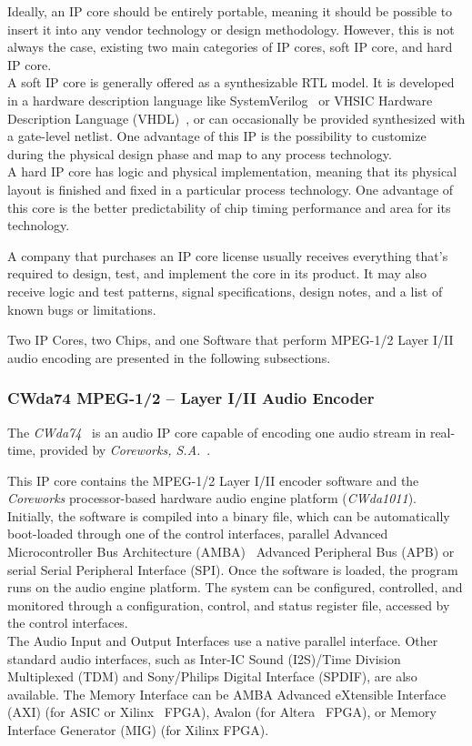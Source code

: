 Ideally, an IP core should be entirely portable, meaning it should be possible to insert it into any vendor technology or design methodology. However, this is not always the case, existing two main categories of IP cores, soft IP core, and hard IP core.\\
A soft IP core is generally offered as a synthesizable RTL model. It is developed in a hardware description language like SystemVerilog~\cite{ieee:systemVerilog} or VHSIC Hardware Description Language (VHDL)~\cite{ieee:vhdl}, or can occasionally be provided synthesized with a gate-level netlist. One advantage of this IP is the possibility to customize during the physical design phase and map to any process technology.\\
A hard IP core has logic and physical implementation, meaning that its physical layout is finished and fixed in a particular process technology.
One advantage of this core is the better predictability of chip timing performance and area for its technology. 

A company that purchases an IP core license usually receives everything that's required to design, test, and implement the core in its product. It may also receive logic and test patterns, signal specifications, design notes, and a list of known bugs or limitations.

Two IP Cores, two Chips, and one Software that perform MPEG-1/2 Layer I/II audio encoding are presented in the following subsections.

\subsubsection{CWda74 MPEG-1/2 – Layer I/II Audio Encoder}
 
The \textit{CWda74}~\cite{CWda74} is an audio IP core capable of encoding one audio stream in real-time, provided by \textit{Coreworks, S.A.}~\cite{coreworks}.

This IP core contains the MPEG-1/2 Layer I/II encoder software and the \textit{Coreworks} processor-based hardware audio engine platform (\textit{CWda1011}).\\
Initially, the software is compiled into a binary file, which can be automatically boot-loaded through one of the control interfaces, parallel Advanced Microcontroller Bus Architecture (AMBA)~\cite{bib:axi_amba} Advanced Peripheral Bus (APB) or serial Serial Peripheral Interface (SPI). 
Once the software is loaded, the program runs on the audio engine platform. The system can be configured, controlled, and monitored through a configuration, control, and status register file, accessed by the control interfaces. \\
The Audio Input and Output Interfaces use a native parallel interface. Other standard audio interfaces, such as Inter-IC Sound (I2S)/Time Division Multiplexed (TDM) and Sony/Philips Digital Interface (SPDIF), are also available.
The Memory Interface can be AMBA Advanced eXtensible Interface (AXI) (for ASIC or Xilinx~\cite{xilinx} FPGA), Avalon (for Altera~\cite{intel} FPGA), or Memory Interface Generator (MIG) (for Xilinx FPGA).

